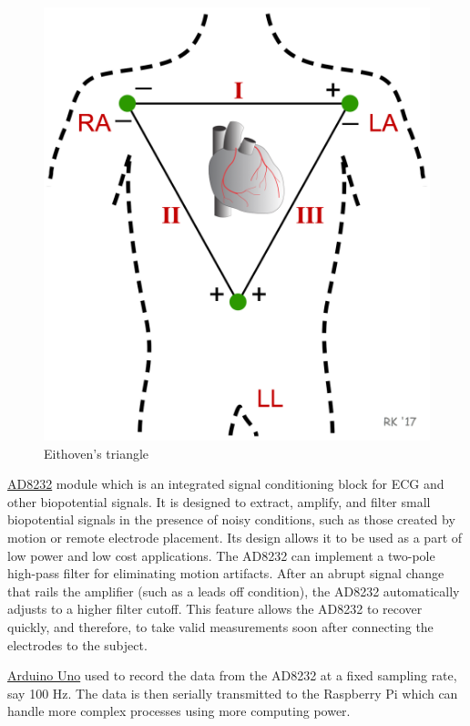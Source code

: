 \documentclass[11pt]{article}
\theoremstyle{definition}
\begin{document}
  \begin{figure}[h]
    \centering
    \includegraphics[scale=0.1]{images/eithoven_triangle.png}
    \caption{Eithoven's triangle\cite{cvp:ECG_eithoven}}
    \label{fig:eithoven_triangle}
  \end{figure}

  \underline{AD8232}\cite{ae:ad8232} module which is an integrated signal conditioning block for ECG and other biopotential signals.
  It is designed to extract, amplify, and filter small biopotential signals in the presence of noisy conditions, such as those created by motion or remote electrode placement.
  Its design allows it to be used as a part of low power and low cost applications.
  The AD8232 can implement a two-pole high-pass filter for eliminating motion artifacts.
  After an abrupt signal change that rails the amplifier (such as a leads off condition), the AD8232 automatically adjusts to a higher filter cutoff.
  This feature allows the AD8232 to recover quickly, and therefore, to take valid measurements soon after connecting the electrodes to the subject.

  \underline{Arduino Uno} used to record the data from the AD8232 at a fixed sampling rate, say 100 Hz.
  The data is then serially transmitted to the Raspberry Pi which can handle more complex processes using more computing power.
\end{document}
